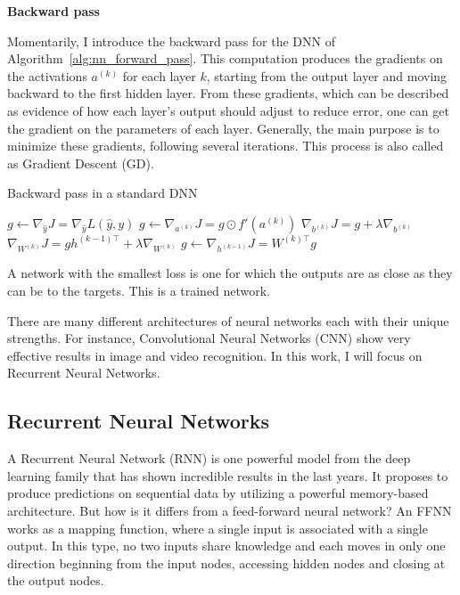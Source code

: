\textbf{Backward pass}

Momentarily, I introduce the backward pass for the DNN of Algorithm~\ref{alg:nn_forward_pass}.
This computation produces the gradients on the activations $a^{(k)}$ for each layer $k$, starting from the output layer and moving backward to the first hidden layer.
From these gradients, which can be described as evidence of how each layer’s output should adjust to reduce error, one can get the gradient on the parameters of each layer.
Generally, the main purpose is to minimize these gradients, following several iterations.
This process is also called as Gradient Descent (GD).

\begin{algorithm}[H]
    \caption{Backward pass in a standard DNN}
    \begin{algorithmic}
        \STATE $g \leftarrow \nabla_{\hat{y}} J = \nabla_{\hat{y}} L(\hat{y},y)$
        \STATE $g \leftarrow \nabla_{a^{(k)}} J = g \odot f'(a^{(k)})$
        \STATE $\nabla_{b^{(k)}} J = g + \lambda \nabla_{b^{(k)}}$
        \STATE $\nabla_{W^{(k)}} J = g h^{(k-1)\top} + \lambda \nabla_{W^{(k)}}$
        \STATE $g \leftarrow \nabla_{h^{(k-1)}} J = W^{(k)\top} g$
        \ENDFOR
    \end{algorithmic}\label{alg:nn_backward_pass}
\end{algorithm}

A network with the smallest loss is one for which the outputs are as close as they can be to the targets.
This is a trained network.

There are many different architectures of neural networks each with their unique strengths.
For instance, Convolutional Neural Networks (CNN) show very effective results in image and video recognition.
In this work, I will focus on Recurrent Neural Networks.

\subsection{Recurrent Neural Networks}\label{subsec:recurrent-neural-networksrnn}

A Recurrent Neural Network (RNN) is one powerful model from the deep learning family that has
shown incredible results in the last years.
It proposes to produce predictions on sequential data by utilizing a powerful memory-based architecture.
But how is it differs from a feed-forward neural network?
An FFNN works as a mapping function, where a single input is associated with a single output.
In this type, no two inputs share knowledge and each moves in
only one direction beginning from the input nodes, accessing
hidden nodes and closing at the output nodes.

